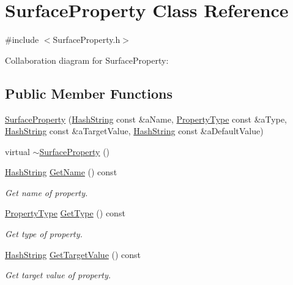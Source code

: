 \hypertarget{classSurfaceProperty}{}\section{Surface\+Property Class Reference}
\label{classSurfaceProperty}


{\ttfamily \#include $<$Surface\+Property.\+h$>$}



Collaboration diagram for Surface\+Property\+:
\subsection*{Public Member Functions}
\begin{DoxyCompactItemize}
\item 
\hyperlink{classSurfaceProperty_a0aa1b03054ca65488c78a6a29552894d}{Surface\+Property} (\hyperlink{classHashString}{Hash\+String} const \&a\+Name, \hyperlink{SurfaceProperty_8h_a7ff5a5c54f182b86d1cd993cf4512c87}{Property\+Type} const \&a\+Type, \hyperlink{classHashString}{Hash\+String} const \&a\+Target\+Value, \hyperlink{classHashString}{Hash\+String} const \&a\+Default\+Value)
\item 
virtual \hyperlink{classSurfaceProperty_a2fcbb8c66fc369863e8d07fe1f127771}{$\sim$\+Surface\+Property} ()
\item 
\hyperlink{classHashString}{Hash\+String} \hyperlink{classSurfaceProperty_a04a6c3be3b1e1f01df3bc9de164e43a5}{Get\+Name} () const 
\begin{DoxyCompactList}\small\item\em Get name of property. \end{DoxyCompactList}\item 
\hyperlink{SurfaceProperty_8h_a7ff5a5c54f182b86d1cd993cf4512c87}{Property\+Type} \hyperlink{classSurfaceProperty_afaac440e32a43294934d781cc1795131}{Get\+Type} () const 
\begin{DoxyCompactList}\small\item\em Get type of property. \end{DoxyCompactList}\item 
\hyperlink{classHashString}{Hash\+String} \hyperlink{classSurfaceProperty_a402f4431baf5c02573bc1408f4c2b756}{Get\+Target\+Value} () const 
\begin{DoxyCompactList}\small\item\em Get target value of property. \end{DoxyCompactList}\item 

\end{DoxyCompactItemize}
